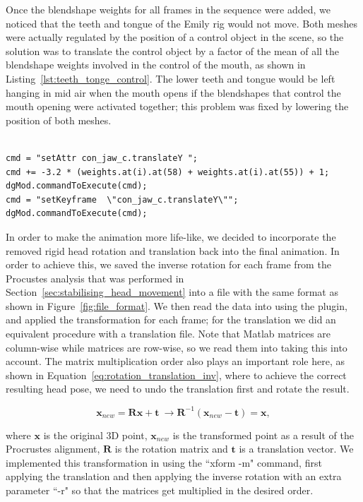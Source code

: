 Once the blendshape weights for all frames in the sequence were added, we noticed that the teeth and tongue of the Emily rig would not move.
Both meshes were actually regulated by the position of a control object in the scene, so the solution was to translate the control object by a factor of the mean of all the blendshape weights involved in the control of the mouth, as shown in Listing~\ref{lst:teeth_tonge_control}.
The lower teeth and tongue would be left hanging in mid air when the mouth opens if the blendshapes that control the mouth opening were activated together; this problem was fixed by lowering the position of both meshes.

\begin{lstlisting}[caption = Teeth and tongue control based on relevant weights., label = lst:teeth_tonge_control, frame=single]

cmd = "setAttr con_jaw_c.translateY ";
cmd += -3.2 * (weights.at(i).at(58) + weights.at(i).at(55)) + 1;
dgMod.commandToExecute(cmd);
cmd = "setKeyframe  \"con_jaw_c.translateY\"";
dgMod.commandToExecute(cmd);
\end{lstlisting}

In order to make the animation more life-like, we decided to incorporate the removed rigid head rotation and translation back into the final animation.
In order to achieve this, we saved the inverse rotation for each frame from the Procustes analysis that was performed in Section~\ref{sec:stabilising_head_movement} into a file with the same format as shown in Figure~\ref{fig:file_format}.
We then read the data into \Maya using the plugin, and applied the transformation for each frame; for the translation we did an equivalent procedure with a translation file.
Note that Matlab matrices are column-wise while \Maya matrices are row-wise, so we read them into \Maya taking this into account.
The matrix multiplication order also plays an important role here, as shown in Equation~\ref{eq:rotation_translation_inv}, where to achieve the correct resulting head pose, we need to undo the translation first and rotate the result.

\begin{equation}
\mathbf{x}_{new} = \mathbf{R} \mathbf{x} + \mathbf{t} ~ \rightarrow  \mathbf{R}^{-1}(\mathbf{x}_{new} - \mathbf{t}) = \mathbf{x},
\label{eq:rotation_translation_inv}
\end{equation}

where $\mathbf{x}$ is the original 3D point, $\mathbf{x}_{new}$ is the transformed point as a result of the Procrustes alignment, $\mathbf{R}$ is the rotation matrix and $\mathbf{t}$ is a translation vector.
We implemented this transformation in \Maya using the ``xform -m" command, first applying the translation and then applying the inverse rotation with an extra parameter ``-r" so that the matrices get multiplied in the desired order.

